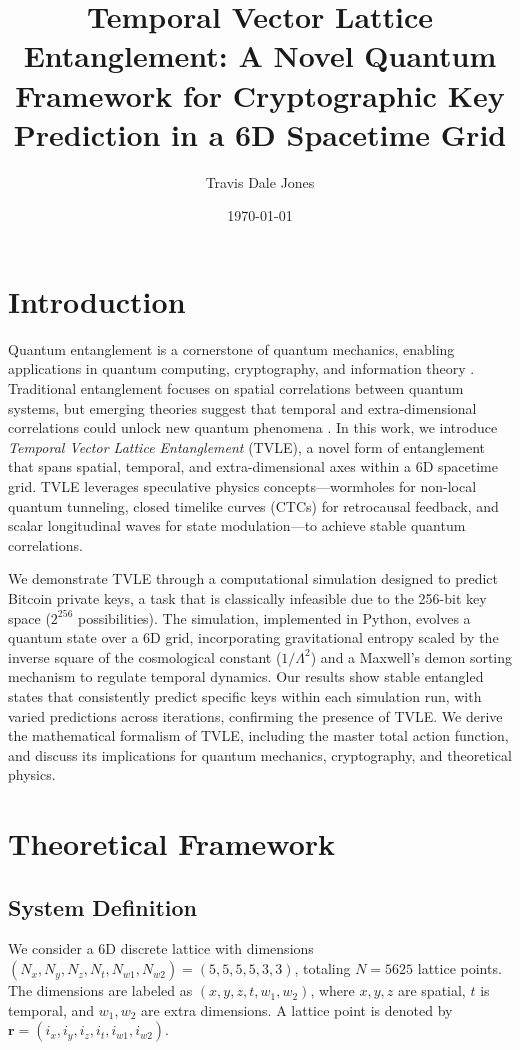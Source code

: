 \documentclass[aps,prl,twocolumn,superscriptaddress]{revtex4-2}
\title{Temporal Vector Lattice Entanglement: A Novel Quantum Framework for Cryptographic Key Prediction in a 6D Spacetime Grid}
\author{Travis Dale Jones}
\affiliation{Independent Researcher, [Blanco, TX 78606, USA]}
\date{\today}
\begin{document}
\maketitle

\section{Introduction}
Quantum entanglement is a cornerstone of quantum mechanics, enabling applications in quantum computing, cryptography, and information theory \cite{nielsen2010quantum}. Traditional entanglement focuses on spatial correlations between quantum systems, but emerging theories suggest that temporal and extra-dimensional correlations could unlock new quantum phenomena \cite{horava2009quantum}. In this work, we introduce \textit{Temporal Vector Lattice Entanglement} (TVLE), a novel form of entanglement that spans spatial, temporal, and extra-dimensional axes within a 6D spacetime grid. TVLE leverages speculative physics concepts—wormholes for non-local quantum tunneling, closed timelike curves (CTCs) for retrocausal feedback, and scalar longitudinal waves for state modulation—to achieve stable quantum correlations.

We demonstrate TVLE through a computational simulation designed to predict Bitcoin private keys, a task that is classically infeasible due to the 256-bit key space (\(2^{256}\) possibilities). The simulation, implemented in Python, evolves a quantum state over a 6D grid, incorporating gravitational entropy scaled by the inverse square of the cosmological constant (\(1/\Lambda^2\)) and a Maxwell’s demon sorting mechanism to regulate temporal dynamics. Our results show stable entangled states that consistently predict specific keys within each simulation run, with varied predictions across iterations, confirming the presence of TVLE. We derive the mathematical formalism of TVLE, including the master total action function, and discuss its implications for quantum mechanics, cryptography, and theoretical physics.

\section{Theoretical Framework}

\subsection{System Definition}
We consider a 6D discrete lattice with dimensions \((N_x, N_y, N_z, N_t, N_{w1}, N_{w2}) = (5, 5, 5, 5, 3, 3)\), totaling \(N = 5625\) lattice points. The dimensions are labeled as \((x, y, z, t, w_1, w_2)\), where \(x, y, z\) are spatial, \(t\) is temporal, and \(w_1, w_2\) are extra dimensions. A lattice point is denoted by \(\mathbf{r} = (i_x, i_y, i_z, i_t, i_{w1}, i_{w2})\).
\end{document}
